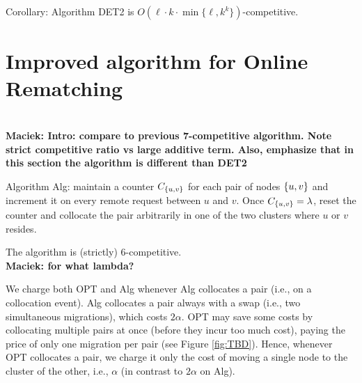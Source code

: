 \documentclass[manuscript,screen=true, review, anonymous]{acmart}
\DeclarePairedDelimiter\set{\{}{\}}
\newcommand\maciek[1]{\color{brown}\textbf{\\ Maciek: #1}\color{black}}
\begin{document}
Corollary: Algorithm DET2 is $O(\ell \cdot k \cdot \min \{ \ell, k^k \})$-competitive.



\section{Improved algorithm for Online Rematching}
\label{sec:k2}



\maciek{Intro: compare to previous 7-competitive algorithm. Note strict competitive ratio vs large additive term. Also, emphasize that in this section the algorithm is different than DET2}

Algorithm Alg:
maintain a counter $C_{\set{u,v}}$ for each pair of nodes $\set{u,v}$ and increment it on every remote request between $u$ and $v$.
Once $C_{\set{u,v}} = \lambda$,
reset the counter and collocate the pair arbitrarily in one of the two clusters where $u$ or $v$ resides.

\begin{theorem} \label{thm:k=2}
	The algorithm is (strictly) 6-competitive.
	\maciek{for what lambda?}
\end{theorem}


We charge both OPT and Alg whenever Alg collocates a pair (i.e., on a collocation event).
Alg collocates a pair always with a swap (i.e., two simultaneous migrations),
which  costs $2\alpha$.
OPT may save some costs by collocating multiple pairs at once (before they incur too much cost),
paying the price of only one migration per pair  (see Figure \ref{fig:TBD}).
Hence,
whenever OPT collocates a pair,
we charge it only the cost of moving a single node to the cluster of the other,
i.e., $\alpha$ (in contrast to $2\alpha$ on Alg).
\end{document}
